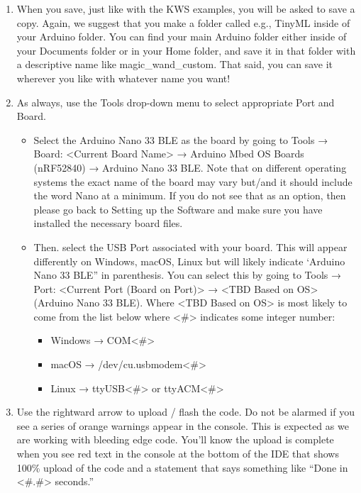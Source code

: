 \begin{enumerate}
 \item When you save, just like with the KWS examples, you will be asked to save a copy. Again, we suggest that you make a folder called e.g., TinyML inside of your Arduino folder. You can find your main Arduino folder either inside of your Documents folder or in your Home folder, and save it in that folder with a descriptive name like magic\_wand\_custom. That said, you can save it wherever you like with whatever name you want!

  \item  As always, use the Tools drop-down menu to select appropriate Port and Board.

    \begin{itemize}    
      \item Select the Arduino Nano 33 BLE as the board by going to Tools → Board: <Current Board Name> → Arduino Mbed OS Boards (nRF52840) → Arduino Nano 33 BLE. Note that on different operating systems the exact name of the board may vary but/and it should include the word Nano at a minimum. If you do not see that as an option, then please go back to Setting up the Software and make sure you have installed the necessary board files.

      \item Then. select the USB Port associated with your board. This will appear differently on Windows, macOS, Linux but will likely indicate ‘Arduino Nano 33 BLE” in parenthesis. You can select this by going to Tools → Port: <Current Port (Board on Port)> → <TBD Based on OS> (Arduino Nano 33 BLE). Where <TBD Based on OS> is most likely to come from the list below where <\#> indicates some integer number:
        \begin{itemize}    
          \item Windows → COM<\#>
          \item macOS → /dev/cu.usbmodem<\#>
          \item Linux → ttyUSB<\#> or ttyACM<\#>
        \end{itemize}    
     \end{itemize}    
  \item   Use the rightward arrow to upload / flash the code. Do not be alarmed if you see a series of orange warnings appear in the console. This is expected as we are working with bleeding edge code. You’ll know the upload is complete when you see red text in the console at the bottom of the IDE that shows 100\% upload of the code and a statement that says something like “Done in <\#.\#> seconds.”


\end{enumerate}
